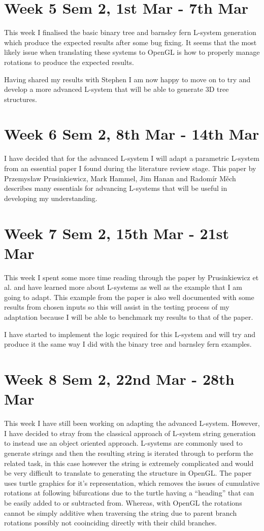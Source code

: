 \documentclass[11pt]{article}
\begin{document}
\section*{Week 5 Sem 2, 1st Mar - 7th Mar}
This week I finalised the basic binary tree and barnsley fern L-system generation which produce 
the expected results after some bug fixing. It seems that the most likely issue when translating 
these systems to OpenGL is how to properly manage rotations to produce the expected results. 

Having shared my results with Stephen I am now happy to move on to try and develop a more advanced 
L-system that will be able to generate 3D tree structures.

\section*{Week 6 Sem 2, 8th Mar - 14th Mar}
I have decided that for the advanced L-system I will adapt a parametric L-system from an essential 
paper I found during the literature review stage. This paper by Przemys\l{}aw Prusinkiewicz, 
Mark Hammel, Jim Hanan and Radom\'{i}r M\v{e}ch describes many essentials for advancing L-systems 
that will be useful in developing my understanding.

\section*{Week 7 Sem 2, 15th Mar - 21st Mar}
This week I spent some more time reading through the paper by Prusinkiewicz et al. and have learned 
more about L-systems as well as the example that I am going to adapt. This example from the paper 
is also well documented with some results from chosen inputs so this will assist in the testing 
process of my adaptation because I will be able to benchmark my results to that of the paper.

I have started to implement the logic required for this L-system and will try and produce it the 
same way I did with the binary tree and barnsley fern examples.

\section*{Week 8 Sem 2, 22nd Mar - 28th Mar}
This week I have still been working on adapting the advanced L-system. However, I have decided 
to stray from the classical approach of L-system string generation to instead use an object 
oriented approach. L-systems are commonly used to generate strings and then the resulting string 
is iterated through to perform the related task, in this case however the string is extremely 
complicated and would be very difficult to translate to generating the structure in OpenGL. 
The paper uses turtle graphics for it's representation, which removes the issues of cumulative 
rotations at following bifurcations due to the turtle having a ``heading'' that can be easily 
added to or subtracted from. Whereas, with OpenGL the rotations cannot be simply additive when 
traversing the string due to parent branch rotations possibly not cooinciding directly with their 
child branches.
\end{document}
